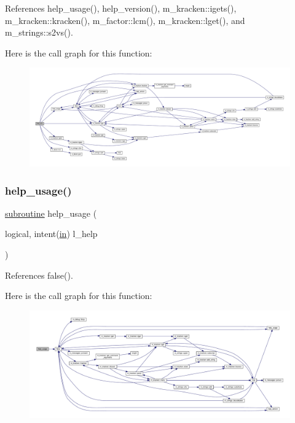 References help\+\_\+usage(), help\+\_\+version(), m\+\_\+kracken\+::igets(), m\+\_\+kracken\+::kracken(), m\+\_\+factor\+::lcm(), m\+\_\+kracken\+::lget(), and m\+\_\+strings\+::s2vs().

Here is the call graph for this function\+:
\nopagebreak
\begin{figure}[H]
\begin{center}
\leavevmode
\includegraphics[width=350pt]{lcm_8f90_a8e76ffedb6cca7be6b5cb9a55b5c5a46_cgraph}
\end{center}
\end{figure}
\mbox{\label{lcm_8f90_a3e09a3b52ee8fb04eeb93fe5761626a8}} 
\subsubsection{\texorpdfstring{help\+\_\+usage()}{help\_usage()}}
{\footnotesize\ttfamily \hyperlink{M__stopwatch_83_8txt_acfbcff50169d691ff02d4a123ed70482}{subroutine} help\+\_\+usage (\begin{DoxyParamCaption}\item[{logical, intent(\hyperlink{M__journal_83_8txt_afce72651d1eed785a2132bee863b2f38}{in})}]{l\+\_\+help }\end{DoxyParamCaption})}



References false().

Here is the call graph for this function\+:
\nopagebreak
\begin{figure}[H]
\begin{center}
\leavevmode
\includegraphics[width=350pt]{lcm_8f90_a3e09a3b52ee8fb04eeb93fe5761626a8_cgraph}
\end{center}
\end{figure}
\mbox{\label{lcm_8f90_a39c21619b08a3c22f19e2306efd7f766}} 

